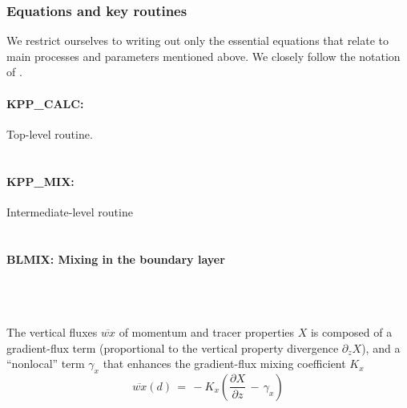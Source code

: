 
\subsubsection{Equations and key routines
\label{sec:pkg:kpp:equations}}

We restrict ourselves to writing out only the essential equations
that relate to main processes and parameters mentioned above.
We closely follow the notation of \cite{lar-eta:94}.

\paragraph{KPP\_CALC:} Top-level routine. \\
~

\paragraph{KPP\_MIX:} Intermediate-level routine \\
~

\paragraph{BLMIX: Mixing in the boundary layer} ~ \\
%
~

The vertical fluxes $\overline{wx}$
of momentum and tracer properties $X$
is composed of a gradient-flux term (proportional to
the vertical property divergence $\partial_z X$), and
a ``nonlocal'' term $\gamma_x$ that enhances the
gradient-flux mixing coefficient $K_x$
%
\begin{equation}
\overline{wx}(d) \, = \, -K_x \left(
\frac{\partial X}{\partial z} \, - \, \gamma_x \right)
\end{equation}

